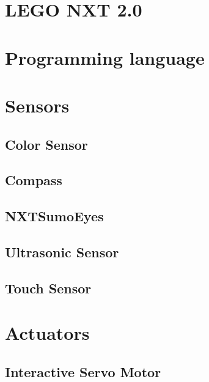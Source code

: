 \section{LEGO NXT 2.0}

\section{Programming language}
\label{leJosStuff}

\section{Sensors}
\label{secSen}
\subsection{Color Sensor}
\label{secColorSensor}
\subsection{Compass}
\label{secCompassSensor}
\subsection{NXTSumoEyes}
\label{secsumoSensor}
\subsection{Ultrasonic Sensor}
\label{section:usexp}
\subsection{Touch Sensor}
\section{Actuators}
\label{secAct}
\subsection{Interactive Servo Motor}
\label{secDaMotors}

\begin{comment} Skal måske bruges hvis det mangler når vi læser igennem senere.
\subsection{Fire and hit system}

\end{comment}

